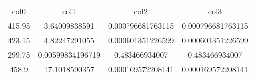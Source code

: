 \begin{table}
\begin{tabular}{cccc}
col0 & col1 & col2 & col3 \\
415.95 & 3.64009838591 & 0.000796681763115 & 0.000796681763115 \\
423.15 & 4.82247291055 & 0.000601351226599 & 0.000601351226599 \\
299.75 & 0.00599834196719 & 0.483466934007 & 0.483466934007 \\
458.9 & 17.1018590357 & 0.000169572208141 & 0.000169572208141 \\
\end{tabular}
\end{table}
